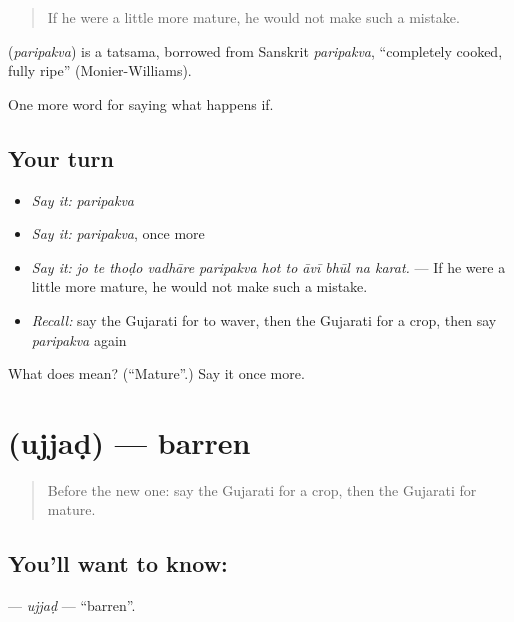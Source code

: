 \begin{quote}
If he were a little more mature, he would not make such a mistake.
\end{quote}

\begin{cousinweb}
\textbf{} (\emph{paripakva}) is a tatsama, borrowed from Sanskrit \emph{paripakva}, \textquotedblleft{}completely cooked, fully ripe\textquotedblright{} (Monier-Williams).
\end{cousinweb}

\begin{grammarlens}[title={What you've built}]
One more word for saying what happens if.
\end{grammarlens}

\subsection*{Your turn}
\begin{itemize}
\raggedright
  \item \emph{Say it:} \emph{paripakva}
  \item \emph{Say it:} \emph{paripakva}, once more
  \item \emph{Say it:} \emph{jo te thoḍo vadhāre paripakva hot to āvī bhūl na karat.} — If he were a little more mature, he would not make such a mistake.
  \item \emph{Recall:} say the Gujarati for to waver, then the Gujarati for a crop, then say \emph{paripakva} again
\end{itemize}

\begin{tcolorbox}[breakable,colback=teal!4,colframe=teal!35!black,title={Before you move on}]
What does  mean? (\textquotedblleft{}Mature\textquotedblright{}.) Say it once more.
\end{tcolorbox}
\section[\texorpdfstring{\gu{ઉજ્જડ} (ujjaḍ)}{ઉજ્જડ (ujjaḍ)}]{ (ujjaḍ) — barren}

\label{lesson:GU-C390-ujjad}



\begin{quote}
Before the new one: say the Gujarati for a crop, then the Gujarati for mature.
\end{quote}

\subsection*{You'll want to know: }
\textbf{} — \emph{ujjaḍ} — \textquotedblleft{}barren\textquotedblright{}.

